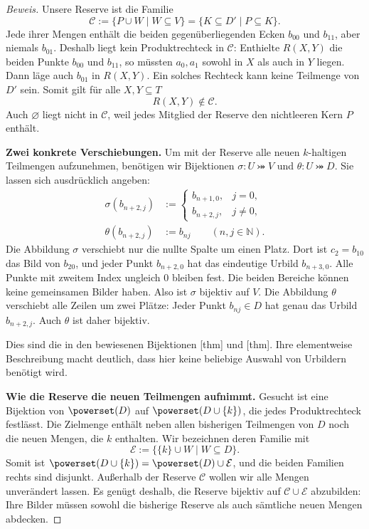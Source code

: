 \begin{proof}[Beweis]
Unsere Reserve ist die Familie
\[
  \mathcal C:=\{P\cup W\mid W\subseteq V\}
    =\{K\subseteq D'\mid P\subseteq K\}.
\]
Jede ihrer Mengen enthält die beiden gegenüberliegenden Ecken
\(b_{00}\) und \(b_{11}\), aber niemals \(b_{01}\).
Deshalb liegt kein Produktrechteck in \(\mathcal C\): Enthielte
\(R(X,Y)\) die beiden Punkte \(b_{00}\) und \(b_{11}\),
so müssten \(a_0,a_1\) sowohl in \(X\) als auch in \(Y\)
liegen. Dann läge auch \(b_{01}\) in \(R(X,Y)\).
Ein solches Rechteck kann keine Teilmenge von \(D'\) sein.
Somit gilt für alle \(X,Y\subseteq T\)
\[
  R(X,Y)\notin\mathcal C.
\]
Auch \(\varnothing\) liegt nicht in \(\mathcal C\), weil jedes
Mitglied der Reserve den nichtleeren Kern \(P\) enthält.

\MogReserveDiagram

\medskip\noindent
\textbf{Zwei konkrete Verschiebungen.}
Um mit der Reserve alle neuen \(k\)-haltigen Teilmengen aufzunehmen,
benötigen wir Bijektionen
\(\sigma\colon U\bij V\) und \(\theta\colon U\bij D\).
Sie lassen sich ausdrücklich angeben:
\[
  \begin{aligned}
    \sigma(b_{n+2,j})&:=
      \begin{cases}
        b_{n+1,0},&j=0,\\
        b_{n+2,j},&j\neq0,
      \end{cases}\\[3pt]
    \theta(b_{n+2,j})&:=b_{nj}
       \qquad(n,j\in\mathbb N).
  \end{aligned}
\]
Die Abbildung \(\sigma\) verschiebt nur die nullte Spalte um einen
Platz. Dort ist \(c_2=b_{10}\) das Bild von \(b_{20}\), und
jeder Punkt \(b_{n+2,0}\) hat das eindeutige Urbild
\(b_{n+3,0}\). Alle Punkte mit zweitem Index ungleich \(0\)
bleiben fest. Die beiden Bereiche können keine gemeinsamen Bilder
haben. Also ist \(\sigma\) bijektiv auf \(V\).
Die Abbildung \(\theta\) verschiebt alle Zeilen um zwei Plätze:
Jeder Punkt \(b_{nj}\in D\) hat genau das Urbild \(b_{n+2,j}\).
Auch \(\theta\) ist daher bijektiv.

\MogShiftDiagram

Dies sind die in den \MogProofsLink{} bewiesenen Bijektionen
[thm] und
[thm]. Ihre elementweise
Beschreibung macht deutlich, dass hier keine beliebige Auswahl von
Urbildern benötigt wird.

\medskip\noindent
\textbf{Wie die Reserve die neuen Teilmengen aufnimmt.}
Gesucht ist eine Bijektion von \(\powerset(D)\) auf
\(\powerset(D\cup\{k\})\), die jedes Produktrechteck festlässt.
Die Zielmenge enthält neben allen bisherigen Teilmengen von \(D\)
noch die neuen Mengen, die \(k\) enthalten. Wir bezeichnen deren
Familie mit
\[
  \mathcal E:=\{\{k\}\cup W\mid W\subseteq D\}.
\]
Somit ist \(\powerset(D\cup\{k\})=\powerset(D)\cup\mathcal E\),
und die beiden Familien rechts sind disjunkt. Außerhalb der Reserve
\(\mathcal C\) wollen wir alle Mengen unverändert lassen.
Es genügt deshalb, die Reserve bijektiv auf
\(\mathcal C\cup\mathcal E\) abzubilden: Ihre Bilder müssen
sowohl die bisherige Reserve als auch sämtliche neuen Mengen abdecken.


\end{proof}
